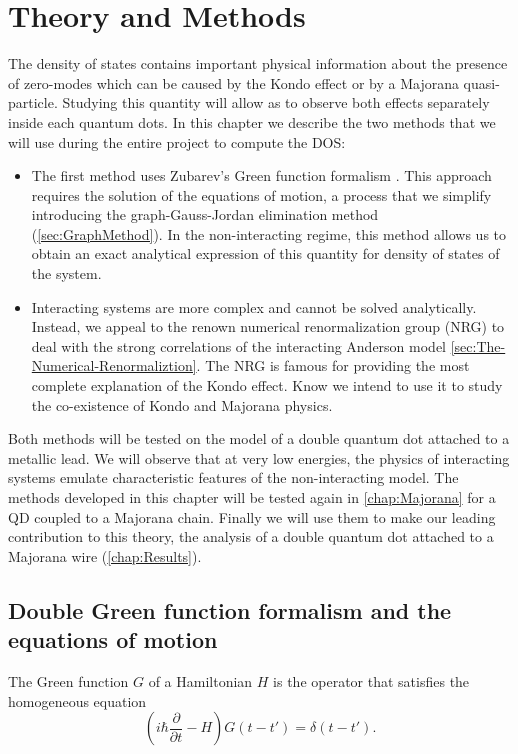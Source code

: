 \chapter{Theory and Methods \label{chap: Methods}}


The density of states contains important physical information about the presence of zero-modes which can be caused by the Kondo effect or by a Majorana quasi-particle. Studying this quantity will allow as to observe both effects separately inside each quantum dots. In this chapter we describe the two methods that we will use during the entire project to compute the DOS:

\begin{itemize}
 \item The first method uses Zubarev's Green function formalism \cite{zubarev_double-time_1960}. This approach requires the solution of the equations of motion,  a process that we simplify introducing the graph-Gauss-Jordan elimination method (\ref{sec:GraphMethod}). In the non-interacting regime, this method allows us to obtain an exact analytical expression of this quantity for density of states of the system.

 \item Interacting systems are more complex and cannot be solved analytically. Instead, we appeal to the renown numerical renormalization group (NRG) to deal with the strong correlations of the interacting Anderson model \ref{sec:The-Numerical-Renormaliztion}. The NRG is famous for providing the most complete explanation of the Kondo effect. Know we intend to use it to study the co-existence of Kondo and Majorana physics.
\end{itemize}

Both methods will be tested on the model of a double quantum dot attached to a metallic lead. We will observe that at very low energies, the physics of interacting systems emulate characteristic features of the non-interacting model. The methods developed in this chapter will be tested  again in \ref{chap:Majorana} for a QD coupled to a Majorana chain. Finally we will use them to make our leading contribution to this theory, the analysis of a double quantum dot attached  to a Majorana wire (\ref{chap:Results}). 


\section{Double Green function formalism and the equations of motion \label{sec:transport} }
The Green function $G$ of a Hamiltonian $H$ is the operator that satisfies the homogeneous equation 
\begin{equation}
    \left(i\hbar\frac{\partial}{\partial t}-H\right)G\left(t-t'\right)=\delta(t-t'). \label{eq:greeni}
\end{equation}

